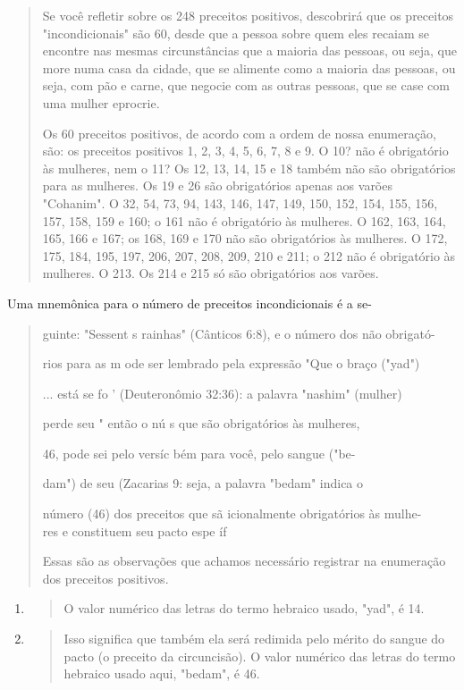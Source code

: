\begin{quote}
Se você refletir sobre os 248 preceitos positivos, descobrirá que os
preceitos "incondicionais" são 60, desde que a pessoa sobre quem eles
recaiam se encontre nas mesmas circunstâncias que a maioria das pessoas,
ou seja, que more numa casa da cidade, que se alimente como a maioria
das pessoas, ou seja, com pão e carne, que negocie com as outras
pessoas, que se case com uma mulher eprocrie.

Os 60 preceitos positivos, de acordo com a ordem de nossa enume­ração,
são: os preceitos positivos 1, 2, 3, 4, 5, 6, 7, 8 e 9. O 10? não é
obrigató­rio às mulheres, nem o 11? Os 12, 13, 14, 15 e 18 também não
são obrigatórios para as mulheres. Os 19 e 26 são obrigatórios apenas
aos varões "Cohanim". O 32, 54, 73, 94, 143, 146, 147, 149, 150, 152,
154, 155, 156, 157, 158, 159 e 160; o 161 não é obrigatório às mulheres.
O 162, 163, 164, 165, 166 e 167; os 168, 169 e 170 não são obrigatórios
às mulheres. O 172, 175, 184, 195, 197, 206, 207, 208, 209, 210 e 211; o
212 não é obrigatório às mulheres. O 213. Os 214 e 215 só são
obrigatórios aos varões.
\end{quote}

Uma mnemônica para o número de preceitos incondicionais é a se-

\begin{quote}
guinte: "Sessent s rainhas" (Cânticos 6:8), e o número dos não obrigató-

rios para as m ode ser lembrado pela expressão "Que o braço ("yad")

... está se fo ' (Deuteronômio 32:36): a palavra "nashim" (mulher)

perde seu " então o nú s que são obrigatórios às mulheres,

46, pode sei pelo versíc bém para você, pelo sangue ("be-

dam") de seu (Zacarias 9: seja, a palavra "bedam" indica o

número (46) dos preceitos que sã icionalmente obrigatórios às mulhe-\\
res e constituem seu pacto espe íf

Essas são as observações que achamos necessário registrar na enu­meração
dos preceitos positivos.
\end{quote}

\begin{enumerate}
\def\labelenumi{\arabic{enumi}.}
\setcounter{enumi}{230}
\item
  \begin{quote}
  O valor numérico das letras do termo hebraico usado, "yad", é 14.
  \end{quote}
\item
  \begin{quote}
  Isso significa que também ela será redimida pelo mérito do sangue do
  pacto (o preceito da circuncisão). O valor numérico das letras do
  termo hebraico usado aqui, "bedam", é 46.
  \end{quote}
\end{enumerate}

